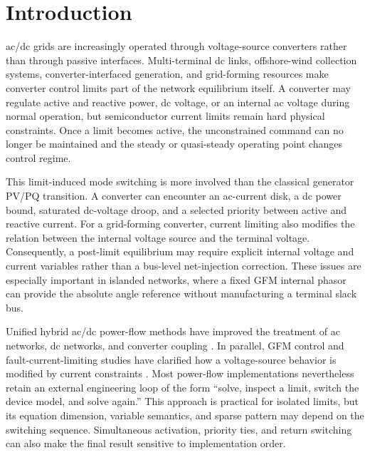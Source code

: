 \section{Introduction}\label{sec:introduction}

 ac/dc grids are increasingly operated through
voltage-source converters rather than through passive interfaces. Multi-terminal
dc links, offshore-wind collection systems, converter-interfaced generation,
and grid-forming resources make converter control limits part of the network
equilibrium itself. A converter may regulate active and reactive power, dc
voltage, or an internal ac voltage during normal operation, but semiconductor
current limits remain hard physical constraints. Once a limit becomes active,
the unconstrained command can no longer be maintained and the steady or
quasi-steady operating point changes control regime.

This limit-induced mode switching is more involved than the classical
generator PV/PQ transition. A converter can encounter an ac-current disk, a dc
power bound, saturated dc-voltage droop, and a selected priority between active
and reactive current. For a grid-forming converter, current limiting also
modifies the relation between the internal voltage source and the terminal
voltage. Consequently, a post-limit equilibrium may require explicit internal
voltage and current variables rather than a bus-level net-injection correction.
These issues are especially important in islanded networks, where a fixed GFM
internal phasor can provide the absolute angle reference without manufacturing
a terminal slack bus.

Unified hybrid ac/dc power-flow methods have improved the treatment of ac
networks, dc networks, and converter coupling
\cite{javid2023unified,sun2024mdhem,pompodakis2021generic}. In parallel, GFM
control and fault-current-limiting studies have clarified how a voltage-source
behavior is modified by current constraints
\cite{rocabert2012microgrid,baeckeland2022stationary}. Most power-flow
implementations nevertheless retain an external engineering loop of the form
``solve, inspect a limit, switch the device model, and solve again.'' This
approach is practical for isolated limits, but its equation dimension,
variable semantics, and sparse pattern may depend on the switching sequence.
Simultaneous activation, priority ties, and return switching can also make the
final result sensitive to implementation order.

